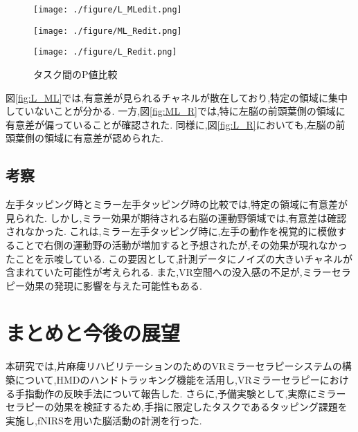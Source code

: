 \begin{figure}[htb]
    \centering
    \begin{minipage}{0.49\linewidth}
        \centering
        \texttt{[image: ./figure/L\_MLedit.png]}
        \label{fig:L_ML}
    \end{minipage}
    \hfill
    \begin{minipage}{0.49\linewidth}
        \centering
        \texttt{[image: ./figure/ML\_Redit.png]}
        \label{fig:ML_R}
    \end{minipage}


    \begin{minipage}{0.49\linewidth}
        \centering
        \texttt{[image: ./figure/L\_Redit.png]}
        \label{fig:L_R}
    \end{minipage}

    \caption{タスク間のP値比較}
    \label{fig:Pvalue_comparison}
\end{figure}

図\ref{fig:L_ML}では,有意差が見られるチャネルが散在しており,特定の領域に集中していないことが分かる.
一方,図\ref{fig:ML_R}では,特に左脳の前頭葉側の領域に有意差が偏っていることが確認された.
同様に,図\ref{fig:L_R}においても,左脳の前頭葉側の領域に有意差が認められた.

\subsection{考察}
左手タッピング時とミラー左手タッピング時の比較では,特定の領域に有意差が見られた.
しかし,ミラー効果が期待される右脳の運動野領域では,有意差は確認されなかった.
これは,ミラー左手タッピング時に,左手の動作を視覚的に模倣することで右側の運動野の活動が増加すると予想されたが,その効果が現れなかったことを示唆している.
この要因として,計測データにノイズの大きいチャネルが含まれていた可能性が考えられる.
また,VR空間への没入感の不足が,ミラーセラピー効果の発現に影響を与えた可能性もある.

\section{まとめと今後の展望}
本研究では,片麻痺リハビリテーションのためのVRミラーセラピーシステムの構築について,HMDのハンドトラッキング機能を活用し,VRミラーセラピーにおける手指動作の反映手法について報告した.
さらに,予備実験として,実際にミラーセラピーの効果を検証するため,手指に限定したタスクであるタッピング課題を実施し,fNIRSを用いた脳活動の計測を行った.

